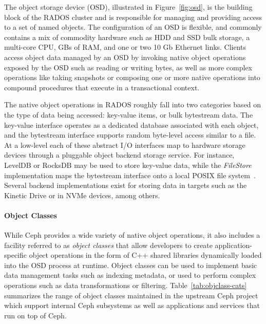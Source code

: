 \documentclass[10pt,twocolumn]{article}
\begin{document}
The object storage device (OSD), illustrated in Figure~\ref{fig:osd}, is the
building block of the RADOS cluster and is responsible for managing and
providing access to a set of
named objects. The configuration of an OSD is flexible, and commonly contains
a mix of commodity hardware such as HDD and SSD bulk storage, a multi-core
CPU, GBs of RAM, and one or two 10 Gb Ethernet links. Clients access object
data managed by an OSD by invoking native object operations exposed by the OSD
such as reading or writing bytes, as well as more complex operations like taking
snapshots or composing one or more native operations into compound procedures
that execute in a transactional context.

The native object operations in RADOS roughly fall into two categories based
on the type of data being accessed: key-value items, or bulk bytestream data.
The key-value interface operates as a dedicated database associated with each
object, and the bytestream interface supports random byte-level access similar
to a file.  At a
low-level each of these abstract I/O interfaces map to hardware storage
devices through a pluggable object backend storage service. For instance,
LevelDB or RocksDB may be used to store key-value data, while the
\emph{FileStore} implementation maps the bytestream interface onto a local
POSIX file system~\cite{leveldb,rocksdb}. Several backend implementations
exist for storing data in targets such as the Kinetic Drive or in NVMe devices,
among others.


\paragraph*{Object Classes}
While Ceph provides a wide variety of native object operations, it also
includes a facility referred to as \emph{object classes} that allow developers
to create application-specific object operations in the form of C++ shared
libraries dynamically loaded into the OSD process at runtime.  Object classes
can be used to implement basic data management tasks such as indexing
metadata, or used to perform complex operations such as data transformations
or filtering. Table~\ref{tab:objclass-cats} summarizes the range of object
classes maintained in the upstream Ceph project which support internal Ceph
subsystems as well as applications and services that run on top of Ceph.
\end{document}
